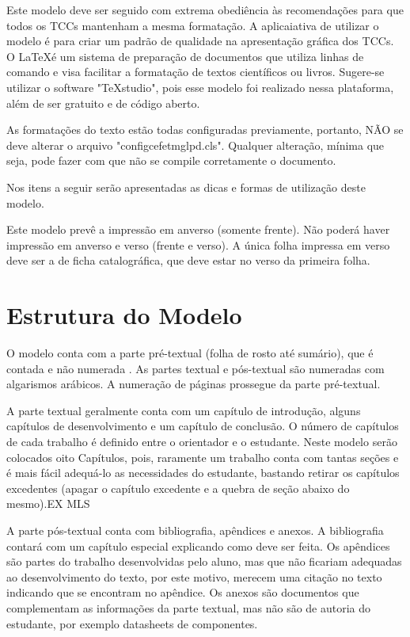 \documentclass[
        oneside,      %
        english,			
        brazil			 
        ]{configcefetmglpd}
\begin{document}
Este modelo deve ser seguido com extrema obediência às recomendações para que todos os TCCs mantenham a mesma formatação. A aplicaiativa de utilizar o modelo é para criar um padrão de qualidade na apresentação gráfica dos TCCs. O \LaTeX é um sistema de preparação de documentos que utiliza linhas de comando e visa facilitar a formatação de textos científicos ou livros. Sugere-se utilizar o software "TeXstudio", pois esse modelo foi realizado nessa plataforma, além de ser gratuito e de código aberto. %

As formatações do texto estão todas configuradas previamente, portanto, NÃO se deve alterar o arquivo "configcefetmglpd.cls". Qualquer alteração, mínima que seja, pode fazer com que não se compile corretamente o documento.

Nos itens a seguir serão apresentadas as dicas e formas de utilização deste modelo.

Este modelo prevê a impressão em anverso (somente frente). Não poderá haver impressão em anverso e verso (frente e verso). A única folha impressa em verso deve ser a de ficha catalográfica, que deve estar no verso da primeira folha.


\section{Estrutura do Modelo} %
\label{sec:estrutura_modelo}  %
O modelo conta com a parte pré-textual (folha de rosto até sumário), que é contada e não numerada \cite{bib:abnt14724}. As partes textual e pós-textual são numeradas com algarismos arábicos. A numeração de páginas prossegue da parte pré-textual.

A parte textual geralmente conta com um capítulo de introdução, alguns capítulos de desenvolvimento e um capítulo de conclusão. O número de capítulos de cada trabalho é definido entre o orientador e o estudante. Neste modelo serão colocados oito Capítulos, pois, raramente um trabalho conta com tantas seções e é mais fácil adequá-lo as necessidades do estudante, bastando retirar os capítulos excedentes (apagar o capítulo excedente e a quebra de seção abaixo do mesmo).\ac{EX} \ac{MLS}

A parte pós-textual conta com bibliografia, apêndices e anexos. A bibliografia contará com um capítulo especial explicando como deve ser feita. Os apêndices são partes do trabalho desenvolvidas pelo aluno, mas que não ficariam adequadas ao desenvolvimento do texto, por este motivo, merecem uma citação no texto indicando que se encontram no apêndice. Os anexos são documentos que complementam as informações da parte textual, mas não são de autoria do estudante, por exemplo datasheets de componentes.
\end{document}
